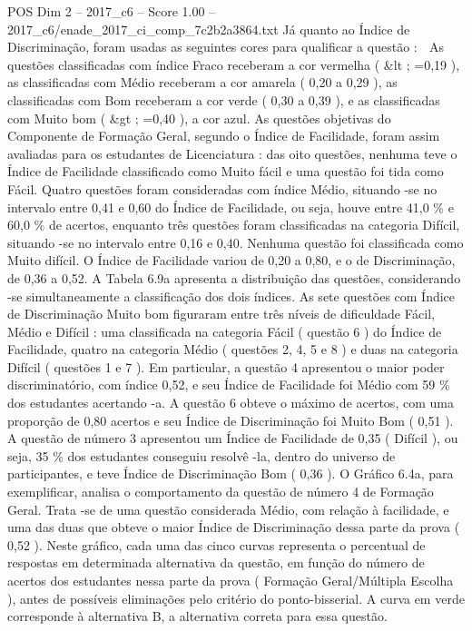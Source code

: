 \begin{textsample}{POS Dim 2 – 2017\_c6 – Score 1.00 – 2017\_c6/enade\_2017\_ci\_comp\_7c2b2a3864.txt}
Já quanto ao Índice de Discriminação, foram usadas as seguintes cores para qualificar a questão :  As questões classificadas com índice Fraco receberam a cor vermelha ( \&lt ; =0,19 ), as classificadas com Médio receberam a cor amarela ( 0,20 a 0,29 ), as classificadas com Bom receberam a cor verde ( 0,30 a 0,39 ), e as classificadas com Muito bom ( \&gt ; =0,40 ), a cor azul.
As questões objetivas do Componente de Formação Geral, segundo o Índice de Facilidade, foram assim avaliadas para os estudantes de Licenciatura : das oito questões, nenhuma teve o Índice de Facilidade classificado como Muito fácil e uma questão foi tida como Fácil.
Quatro questões foram consideradas com índice Médio, situando -se no intervalo entre 0,41 e 0,60 do Índice de Facilidade, ou seja, houve entre 41,0 \% e 60,0 \% de acertos, enquanto três questões foram classificadas na categoria Difícil, situando -se no intervalo entre 0,16 e 0,40.
Nenhuma questão foi classificada como Muito difícil.
O Índice de Facilidade variou de 0,20 a 0,80, e o de Discriminação, de 0,36 a 0,52.
A Tabela 6.9a apresenta a distribuição das questões, considerando -se simultaneamente a classificação dos dois índices.
As sete questões com Índice de Discriminação Muito bom figuraram entre três níveis de dificuldade Fácil, Médio e Difícil : uma classificada na categoria Fácil ( questão 6 ) do Índice de Facilidade, quatro na categoria Médio ( questões 2, 4, 5 e 8 ) e duas na categoria Difícil ( questões 1 e 7 ).
Em particular, a questão 4 apresentou o maior poder discriminatório, com índice 0,52, e seu Índice de Facilidade foi Médio com 59 \% dos estudantes acertando -a.
A questão 6 obteve o máximo de acertos, com uma proporção de 0,80 acertos e seu Índice de Discriminação foi Muito Bom ( 0,51 ).
A questão de número 3 apresentou um Índice de Facilidade de 0,35 ( Difícil ), ou seja, 35 \% dos estudantes conseguiu resolvê -la, dentro do universo de participantes, e teve Índice de Discriminação Bom ( 0,36 ).
O Gráfico 6.4a, para exemplificar, analisa o comportamento da questão de número 4 de Formação Geral.
Trata -se de uma questão considerada Médio, com relação à facilidade, e uma das duas que obteve o maior Índice de Discriminação dessa parte da prova ( 0,52 ).
Neste gráfico, cada uma das cinco curvas representa o percentual de respostas em determinada alternativa da questão, em função do número de acertos dos estudantes nessa parte da prova ( Formação Geral/Múltipla Escolha ), antes de possíveis eliminações pelo critério do ponto-bisserial.
A curva em verde corresponde à alternativa B, a alternativa correta para essa questão.

\end{textsample}
